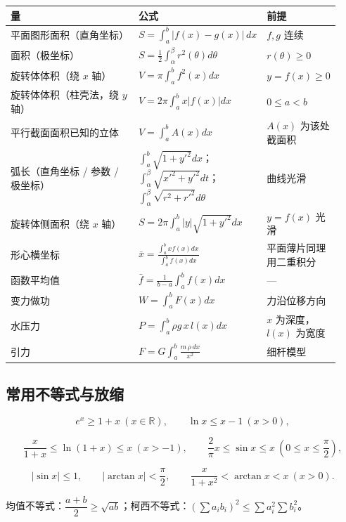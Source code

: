 \documentclass[11pt,openany,UTF8]{ctexbook}
\begin{document}
\begingroup\small\setlength{\tabcolsep}{4.0pt}
\begin{longtable}{@{}L{0.4708\linewidth}L{0.2288\linewidth}L{0.2288\linewidth}@{}}
\toprule
\textbf{量} & \textbf{公式} & \textbf{前提} \\
\midrule
\endhead
平面图形面积（直角坐标） & $S=\int_a^b\lvert f(x)-g(x)\rvert\,dx$ & $f,g$ 连续 \\
面积（极坐标） & $S=\frac12\int_{\alpha}^{\beta}r^2(\theta)d\theta$ & $r(\theta)\ge0$ \\
旋转体体积（绕 $x$ 轴） & $V=\pi\int_a^bf^2(x)dx$ & $y=f(x)\ge0$ \\
旋转体体积（柱壳法，绕 $y$ 轴） & $V=2\pi\int_a^bx\lvert f(x)\rvert dx$ & $0\le a<b$ \\
平行截面面积已知的立体 & $V=\int_a^bA(x)dx$ & $A(x)$ 为该处截面积 \\
弧长（直角坐标 / 参数 / 极坐标） & $\int_a^b\sqrt{1+y'^2}dx$；$\int_{\alpha}^{\beta}\sqrt{x'^2+y'^2}dt$；$\int_{\alpha}^{\beta}\sqrt{r^2+r'^2}d\theta$ & 曲线光滑 \\
旋转体侧面积（绕 $x$ 轴） & $S=2\pi\int_a^b\lvert y\rvert\sqrt{1+y'^2}dx$ & $y=f(x)$ 光滑 \\
形心横坐标 & $\bar x=\frac{\int_a^bx f(x)dx}{\int_a^bf(x)dx}$ & 平面薄片同理用二重积分 \\
函数平均值 & $\bar f=\frac{1}{b-a}\int_a^bf(x)dx$ & — \\
变力做功 & $W=\int_a^bF(x)dx$ & 力沿位移方向 \\
水压力 & $P=\int_a^b\rho g\,x\,l(x)dx$ & $x$ 为深度，$l(x)$ 为宽度 \\
引力 & $F=G\int_a^b\frac{m\,\rho\,dx}{x^2}$ & 细杆模型 \\
\bottomrule
\end{longtable}
\endgroup

\subsection{常用不等式与放缩}

\[e^x\ge 1+x\ (x\in\mathbb R),\qquad \ln x\le x-1\ (x>0),\]

\[\frac{x}{1+x}\le\ln(1+x)\le x\ (x>-1),\qquad \frac{2}{\pi}x\le\sin x\le x\ \left(0\le x\le\frac{\pi}{2}\right),\]

\[\lvert\sin x\rvert\le1,\qquad \lvert\arctan x\rvert<\frac{\pi}{2},\qquad \frac{x}{1+x^2}<\arctan x<x\ (x>0).\]

均值不等式：$\dfrac{a+b}{2}\ge\sqrt{ab}$；柯西不等式：$\left(\sum a_ib_i\right)^2\le\sum a_i^2\sum b_i^2$。
\end{document}
